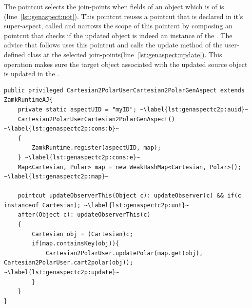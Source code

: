 
The  pointcut selects the join-points when fields of an object which is of  is  (line~\ref{lst:genaspect:uot}). This pointcut reuses a pointcut that is  declared in it's super-aspect, called  and narrows the scope of this pointcut by composing an  pointcut that checks if the updated object is indeed an instance of the . The  advice that follows uses this pointcut and calls the update method of the user-defined class at the selected join-points(line~\ref{lst:genaspect:update}). 
This operation makes sure the target object associated with the updated source object is updated in the . 

\begin{lstlisting}[float, caption={The aspect generated for the Cartesian to Polar converter in listing~\ref{lst:c2pconverter}}, label={lst:c2pconvertergenaspect}]
public privileged Cartesian2PolarUserCartesian2PolarGenAspect extends ZamkRuntimeAJ{
	private static aspectUID = "myID"; ~\label{lst:genaspectc2p:auid}~
	Cartesian2PolarUserCartesian2PolarGenAspect() ~\label{lst:genaspectc2p:cons:b}~
	{
		ZamkRuntime.register(aspectUID, map);
	} ~\label{lst:genaspectc2p:cons:e}~
	Map<Cartesian, Polar> map = new WeakHashMap<Cartesian, Polar>(); ~\label{lst:genaspectc2p:map}~

	pointcut updateObserverThis(Object c): updateObserver(c) && if(c instanceof Cartesian); ~\label{lst:genaspectc2p:uot}~
	after(Object c): updateObserverThis(c)
	{
		Cartesian obj = (Cartesian)c;
		if(map.containsKey(obj)){
			Cartesian2PolarUser.updatePolar(map.get(obj), Cartesian2PolarUser.cart2polar(obj)); ~\label{lst:genaspectc2p:update}~
		}	
	}
}
\end{lstlisting}

